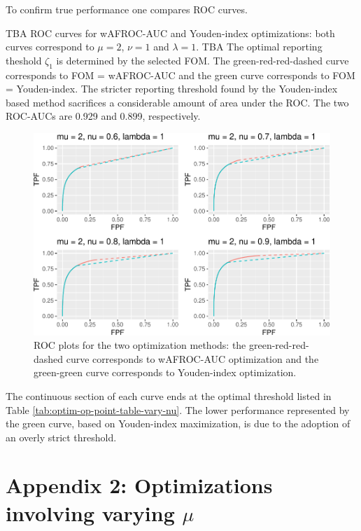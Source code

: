 \documentclass[
]{book}
\begin{document}
To confirm true performance one compares ROC curves.

TBA ROC curves for wAFROC-AUC and Youden-index optimizations: both curves correspond to \(\mu = 2\), \(\nu = 1\) and \(\lambda = 1\). TBA The optimal reporting theshold \(\zeta_1\) is determined by the selected FOM. The green-red-red-dashed curve corresponds to FOM = wAFROC-AUC and the green curve corresponds to FOM = Youden-index. The stricter reporting threshold found by the Youden-index based method sacrifices a considerable amount of area under the ROC. The two ROC-AUCs are 0.929 and 0.899, respectively.

\begin{figure}
\centering
\includegraphics{21-optim-op-point_files/figure-latex/optim-op-point-vary-nu-roc-1.pdf}
\caption{\label{fig:optim-op-point-vary-nu-roc}ROC plots for the two optimization methods: the green-red-red-dashed curve corresponds to wAFROC-AUC optimization and the green-green curve corresponds to Youden-index optimization.}
\end{figure}

The continuous section of each curve ends at the optimal threshold listed in Table \ref{tab:optim-op-point-table-vary-nu}. The lower performance represented by the green curve, based on Youden-index maximization, is due to the adoption of an overly strict threshold.

\hypertarget{optim-op-point-vary-mu}{%
\section{\texorpdfstring{Appendix 2: Optimizations involving varying \(\mu\)}{Appendix 2: Optimizations involving varying \textbackslash mu}}\label{optim-op-point-vary-mu}}
\end{document}
